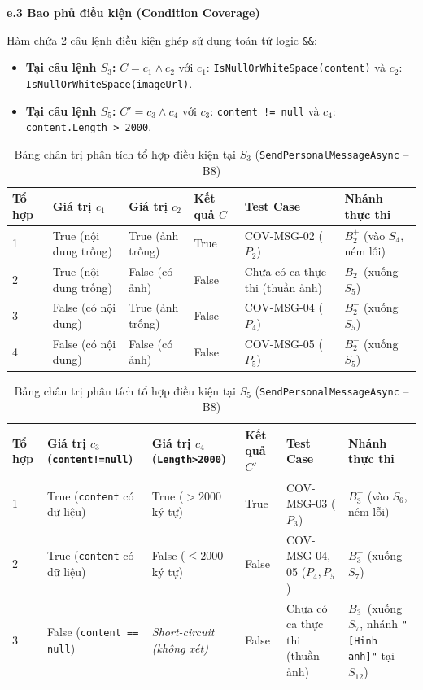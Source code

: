 \documentclass[11pt,a4paper]{article}
\begin{document}
\noindent\textbf{e.3 Bao phủ điều kiện (Condition Coverage)}

\noindent Hàm chứa 2 câu lệnh điều kiện ghép sử dụng toán tử logic \texttt{\&\&}:
{\sloppy
\begin{itemize}[leftmargin=1.2cm, label=$\bullet$, noitemsep]
    \item \textbf{Tại câu lệnh $S_3$:} $C = c_1 \land c_2$ với $c_1$: \texttt{IsNullOrWhiteSpace(content)} và $c_2$: \texttt{IsNullOrWhiteSpace(imageUrl)}.
    \item \textbf{Tại câu lệnh $S_5$:} $C' = c_3 \land c_4$ với $c_3$: \texttt{content != null} và $c_4$: \texttt{content.Length > 2000}.
\end{itemize}
}

\begin{table}[H]
\centering
\small
\begin{tabularx}{\textwidth}{|C{1.3cm}|L{2.8cm}|L{2.7cm}|C{1.7cm}|C{2.4cm}|X|}
\hline
{}
\textbf{Tổ hợp} & \textbf{Giá trị $c_1$} & \textbf{Giá trị $c_2$} & \textbf{Kết quả $C$} & \textbf{Test Case} & \textbf{Nhánh thực thi} \tabularnewline
{} & True (nội dung trống) & True (ảnh trống) & True & COV-MSG-02 ($P_2$) & $B_2^+$ (vào $S_4$, ném lỗi) \\  & True (nội dung trống) & False (có ảnh) & False & Chưa có ca thực thi (thuần ảnh) & $B_2^-$ (xuống $S_5$) \\  & False (có nội dung) & True (ảnh trống) & False & COV-MSG-04 ($P_4$) & $B_2^-$ (xuống $S_5$) \\  & False (có nội dung) & False (có ảnh) & False & COV-MSG-05 ($P_5$) & $B_2^-$ (xuống $S_5$) \\ \hline
\end{tabularx}
\caption{Bảng chân trị phân tích tổ hợp điều kiện tại $S_3$ (\texttt{SendPersonalMessageAsync} -- B8)}
\end{table}

\begin{table}[H]
\centering
\small
\begin{tabularx}{\textwidth}{|C{1.3cm}|L{2.8cm}|L{2.8cm}|C{1.7cm}|C{2.4cm}|X|}
\hline
{}
\textbf{Tổ hợp} & \textbf{Giá trị $c_3$ (\texttt{content!=null})} & \textbf{Giá trị $c_4$ (\texttt{Length>2000})} & \textbf{Kết quả $C'$} & \textbf{Test Case} & \textbf{Nhánh thực thi} \tabularnewline
{} & True (\texttt{content} có dữ liệu) & True ($> 2000$ ký tự) & True & COV-MSG-03 ($P_3$) & $B_3^+$ (vào $S_6$, ném lỗi) \\  & True (\texttt{content} có dữ liệu) & False ($\le 2000$ ký tự) & False & COV-MSG-04, 05 ($P_4, P_5$) & $B_3^-$ (xuống $S_7$) \\  & False (\texttt{content == null}) & \textit{Short-circuit (không xét)} & False & Chưa có ca thực thi (thuần ảnh) & $B_3^-$ (xuống $S_7$, nhánh \texttt{"[Hinh anh]"} tại $S_{12}$) \\ \hline
\end{tabularx}
\caption{Bảng chân trị phân tích tổ hợp điều kiện tại $S_5$ (\texttt{SendPersonalMessageAsync} -- B8)}
\end{table}
\end{document}
